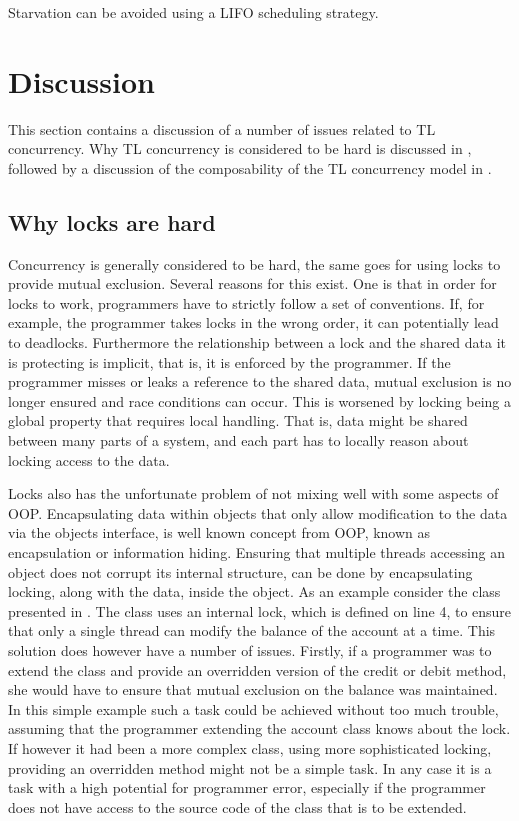 Starvation can be avoided using a \ac{LIFO} scheduling strategy\cite[p. 459]{tanenbaum2008modern}.

\section{Discussion}
This section contains a discussion of a number of issues related to \ac{TL} concurrency. Why \ac{TL} concurrency is considered to be hard is discussed in , followed by a discussion of the composability of the \ac{TL} concurrency model in .
\subsection{Why locks are hard}\label{subsec:tl_lock_hard}
Concurrency is generally considered to be hard, the same goes for using locks to provide mutual exclusion\cite[p. 56]{sutter2005software}. Several reasons for this exist. One is that in order for locks to work, programmers have to strictly follow a set of conventions. If, for example, the programmer takes locks in the wrong order, it can potentially lead to deadlocks\cite[p. 58]{sutter2005software}. Furthermore the relationship between a lock and the shared data it is protecting is implicit, that is, it is enforced by the programmer. If the programmer misses or leaks a reference to the shared data, mutual exclusion is no longer ensured and race conditions can occur. This is worsened by locking being a global property that requires local handling. That is, data might be shared between many parts of a system, and each part has to locally reason about locking access to the data.

Locks also has the unfortunate problem of not mixing well with some aspects of \ac{OOP}. Encapsulating data within objects that only allow modification to the data via the objects interface, is well known concept from \ac{OOP}, known as encapsulation or information hiding. Ensuring that multiple threads accessing an object does not corrupt its internal structure, can be done by encapsulating locking, along with the data, inside the object. As an example consider the  class presented in . The  class uses an internal lock, which is defined on line 4, to ensure that only a single thread can modify the balance of the account at a time. This solution does however have a number of issues. Firstly, if a programmer was to extend the  class and provide an overridden version of the credit or debit method, she would have to ensure that mutual exclusion on the balance was maintained. In this simple example such a task could be achieved without too much trouble, assuming that the programmer extending the account class knows about the lock. If however it had been a more complex class, using more sophisticated locking, providing an overridden method might not be a simple task. In any case it is a task with a high potential for programmer error, especially if the programmer does not have access to the source code of the class that is to be extended.


